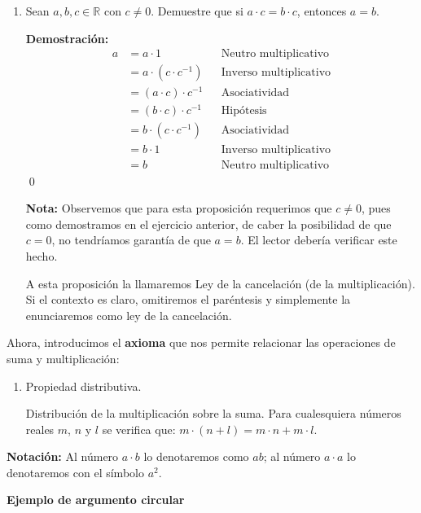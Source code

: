\documentclass[11pt]{article}
\newcommand{\R}{\mathbb{R}}
\begin{document}
\begin{enumerate}[label=\alph*)]
        \item Sean $a,b,c\in \R$ con $c\neq 0$. Demuestre que si $a\cdot c=b\cdot c$, entonces $a=b$.
            
        \textbf{Demostración:} \begin{align*}
        a &= a\cdot 1 && \text{Neutro multiplicativo}\\
        &= a \cdot (c\cdot c^{-1}) && \text{Inverso multiplicativo}\\
        &= (a \cdot c) \cdot c^{-1} && \text{Asociatividad}\\
        &= (b \cdot c) \cdot c^{-1} && \text{Hipótesis}\\
        &= b \cdot (c\cdot c^{-1}) && \text{Asociatividad}\\
        &= b \cdot 1 && \text{Inverso multiplicativo}\\
        &= b && \text{Neutro multiplicativo}
        \end{align*} \qed
    
        \textbf{Nota:} Observemos que para esta proposición requerimos que $c\neq 0$, pues como demostramos en el ejercicio anterior, de caber la posibilidad de que $c=0$, no tendríamos garantía de que $a=b$. El lector debería verificar este hecho.%

        A esta proposición la llamaremos Ley de la cancelación (de la multiplicación). Si el contexto es claro, omitiremos el paréntesis y simplemente la enunciaremos como ley de la cancelación.

    \end{enumerate}

    Ahora, introducimos el \textbf{axioma} que nos permite relacionar las operaciones de suma y multiplicación:

\begin{enumerate}[label=P.D.]
    \item Propiedad distributiva.
    
    Distribución de la multiplicación sobre la suma. Para cualesquiera números reales $m$, $n$ y $l$ se verifica que: $ m \cdot (n+l)=m \cdot n+m \cdot l $.
\end{enumerate}

\textbf{Notación:} Al número $a\cdot b$ lo denotaremos como $ab$; al número $a\cdot a$ lo denotaremos con el símbolo $a^2$.

\textbf{Ejemplo de argumento circular}
\end{document}
